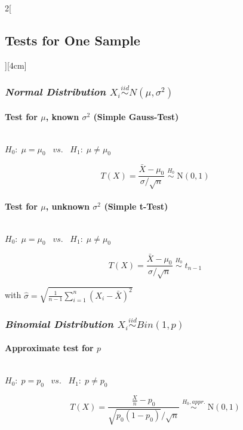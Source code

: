 \documentclass[8pt]{extarticle}
\begin{document}
\begin{multicols}{2}[\subsection{Tests for One Sample}][4cm]

\subsubsection*{\textit{Normal Distribution $X_i \overset{iid}{\sim} N(\mu,\sigma^2)$}}

  \paragraph{Test for $\mu$, known $\sigma^2 $ (Simple Gauss-Test)} \ \\
  
  \noindent $H_0\!:\; \mu = \mu_0 \;\;\; vs. \;\;\; H_1\!:\; \mu \neq \mu_0$
  
  $$T(X) = \frac{\bar{X} -\mu_0}{\sigma/\sqrt{n}} \;\overset{H_0}{\sim} \;\mathrm{N}(0,1)$$
  
  
  
  \paragraph{Test for $\mu$, unknown $\sigma^2 $ (Simple t-Test)} \ \\
  
  \noindent $H_0\!:\; \mu = \mu_0 \;\;\; vs. \;\;\; H_1\!:\; \mu \neq \mu_0$
  
  $$T(X) = \frac{\bar{X} -\mu_0}{\hat{\sigma}/\sqrt{n}} \;\overset{H_0}{\sim}\; t_{n-1}$$
  
  \noindent with $\hat{\sigma} = \sqrt{\frac{1}{n-1} \sum_{i=1}^n(X_i - \bar{X})^2}$
  
  \subsubsection*{\textit{Binomial Distribution $X_i \overset{iid}{\sim} Bin(1,p)$}}
  
  \paragraph{Approximate test for $p$} \ \\
  
  \noindent $H_0\!:\; p = p_0 \;\;\; vs. \;\;\; H_1\!:\; p \neq p_0$
  
  $$T(X) = \frac{\frac{X}{n} -p_0}{\sqrt{p_0(1-p_0)}/\sqrt{n}} \;\overset{H_0, appr.}{\sim}\; \mathrm{N}(0,1)$$


\end{multicols}
\end{document}
